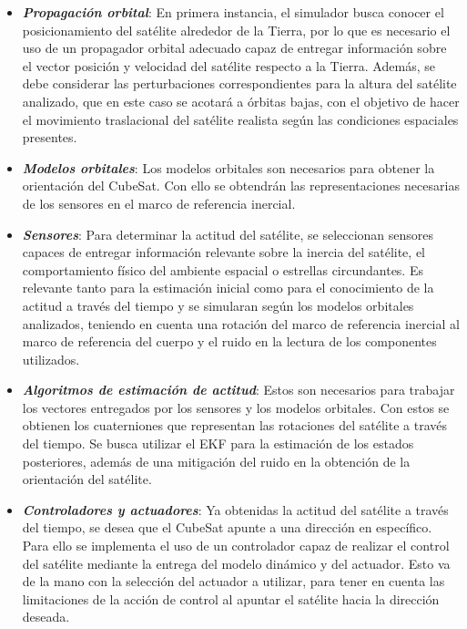 \begin{itemize}
	\item \textbf{\textit{Propagación orbital}}: En primera instancia, el simulador busca conocer el posicionamiento del satélite alrededor de la Tierra, por lo que es necesario el uso de un propagador orbital adecuado capaz de entregar información sobre el vector posición y velocidad del satélite respecto a la Tierra. Además, se debe considerar las perturbaciones correspondientes para la altura del satélite analizado, que en este caso se acotará a órbitas bajas, con el objetivo de hacer el movimiento traslacional del satélite realista según las condiciones espaciales presentes.
	
	\item \textbf{\textit{Modelos orbitales}}: Los modelos orbitales son necesarios para obtener la orientación del CubeSat. Con ello se obtendrán las representaciones necesarias de los sensores en el marco de referencia inercial.
	
	\item \textbf{\textit{Sensores}}: Para determinar la actitud del satélite, se seleccionan sensores capaces de entregar información relevante sobre la inercia del satélite, el comportamiento físico del ambiente espacial o estrellas circundantes. Es relevante tanto para la estimación inicial como para el conocimiento de la actitud a través del tiempo y se simularan según los modelos orbitales analizados, teniendo en cuenta una rotación del marco de referencia inercial al marco de referencia del cuerpo y el ruido en la lectura de los componentes utilizados.
	
	\item \textbf{\textit{Algoritmos de estimación de actitud}}: Estos son necesarios para trabajar los vectores entregados por los sensores y los modelos orbitales. Con estos se obtienen los cuaterniones que representan las rotaciones del satélite a través del tiempo. Se busca utilizar el \gls{EKF} para la estimación de los estados posteriores, además de una mitigación del ruido en la obtención de la orientación del satélite.
	
	\item \textbf{\textit{ Controladores y actuadores}}: Ya obtenidas la actitud del satélite a través del tiempo, se desea que el CubeSat apunte a una dirección en específico. Para ello se implementa el uso de un controlador capaz de realizar el control del satélite mediante la entrega del modelo dinámico y del actuador. Esto va de la mano con la selección del actuador a utilizar, para tener en cuenta las limitaciones de la acción de control al apuntar el satélite hacia la dirección deseada.
	
\end{itemize}

